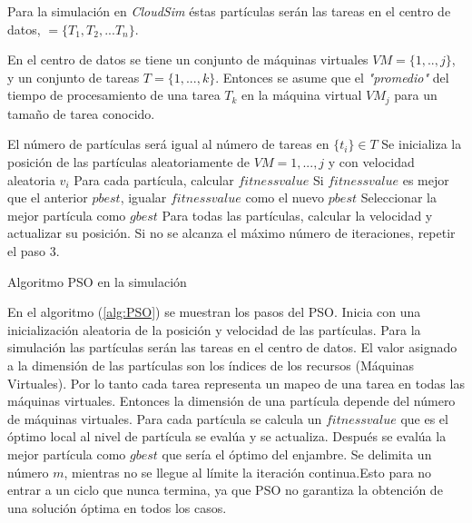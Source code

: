Para la simulación en \textit{CloudSim} éstas partículas serán las tareas en el centro de datos, $ = \{T_1 , T_2 , ... T_n\}  $.


En el centro de datos se tiene un conjunto de máquinas virtuales $VM = \{1,..,j\}$, y un conjunto de tareas $T = \{1,...,k\}$. Entonces se asume que el \textit{"promedio"} del tiempo de procesamiento de una tarea $T_k$ en la máquina virtual $VM_j$ para un tamaño de tarea conocido.




\begin{algorithm} 
	\begin{algorithmic}[1]
		\State El número de partículas será igual al número de tareas en $ \{ t_i \} \in T $
		\State Se inicializa la posición de las partículas aleatoriamente de $VM = 1,...,j $ y con velocidad aleatoria $v_i$
		\State Para cada partícula, calcular $fitness value$
		\State Si $fitness value$ es mejor que el anterior $pbest$, igualar $fitness value$ como el nuevo $pbest$
		\State Seleccionar la mejor partícula como $gbest$
		\State Para todas las partículas, calcular la velocidad y actualizar su posición.
		\State Si no se alcanza el máximo número de iteraciones, repetir el paso 3.
		
	\end{algorithmic} 
	\caption{Algoritmo PSO en la simulación}
	\label{alg:PSO}
\end{algorithm}

\newpage

En el algoritmo (\ref{alg:PSO}) se muestran los pasos del PSO. Inicia con una inicialización aleatoria de la posición y velocidad de las partículas. Para la simulación las partículas serán las tareas en el centro de datos.
El valor asignado a la dimensión de las partículas son los índices de los recursos (Máquinas Virtuales). Por lo tanto cada tarea representa un mapeo de una tarea en todas las máquinas virtuales. Entonces la dimensión de una partícula depende del número de máquinas virtuales.
Para cada partícula se calcula un $fitnessvalue$ que es el óptimo local al nivel de partícula se evalúa y se actualiza. 
Después se evalúa la mejor partícula como $gbest$ que sería el óptimo del enjambre.
Se delimita un número $m$, mientras no se llegue al límite la iteración continua.Esto para no entrar a un ciclo que nunca termina, ya que PSO  no garantiza la obtención de una solución óptima en todos los casos\cite{osman2012}.

